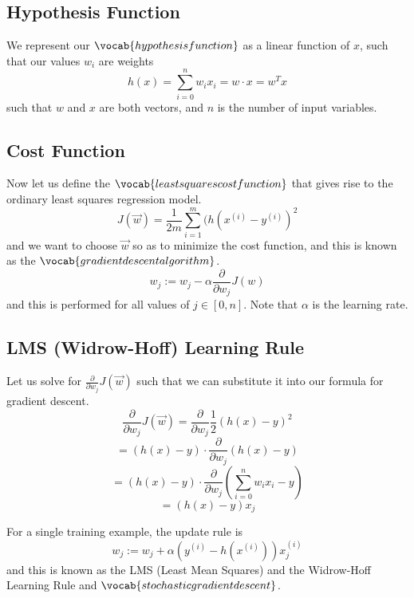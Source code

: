 \documentclass[12pt]{scrartcl}
\begin{document}
\subsection{Hypothesis Function}
\begin{definition}
We represent our $\vocab{hypothesis function}$ as a linear function of $x$, such that our values $w_i$ are weights
\[h(x) = \sum_{i=0}^nw_ix_i = w \cdot x = w^Tx\]
such that $w$  and $x$  are both vectors, and $n$ is the number of input variables.
    
\end{definition}

\subsection{Cost Function}
\begin{definition}
    Now let us define the $\vocab{least squares cost function}$ that gives rise to the ordinary least squares regression model.
\[J(\vec{w}) = \frac{1}{2m} \sum_{i=1}^m(h(x^{(i)} - y^{(i)})^2\]
and we want to choose $\vec{w}$ so as to minimize the cost function, and this is known as the $\vocab{gradient descent algorithm}$.
\[w_j := w_j - \alpha \frac{\partial}{\partial w_j}J(w)\]
and this is performed for all values of $j \in [0, n]$. Note that $\alpha$ is the learning rate.
\end{definition}
\subsection{LMS (Widrow-Hoff) Learning Rule}
Let us solve for $\frac{\partial}{\partial w_j}J(\vec{w})$ such that we can substitute it into our formula for gradient descent.
\[\frac{\partial}{\partial w_j}J(\vec{w}) = \frac{\partial}{\partial w_j}\frac{1}{2}(h(x) - y)^2\]
\[= (h(x) - y) \cdot \frac{\partial}{\partial w_j}(h(x) - y)\]
\[= (h(x) - y) \cdot \frac{\partial}{\partial w_j}(\sum_{i=0}^nw_ix_i - y)\]
\[= (h(x) - y)x_j\]
\begin{definition}
    For a single training example, the update rule is 
\[w_j := w_j + \alpha(y^{(i)} - h(x^{(i)}))x_j^{(i)}\]
and this is known as the LMS (Least Mean Squares) and the Widrow-Hoff Learning Rule and $\vocab{stochastic gradient descent}$.
\end{definition}
\end{document}
